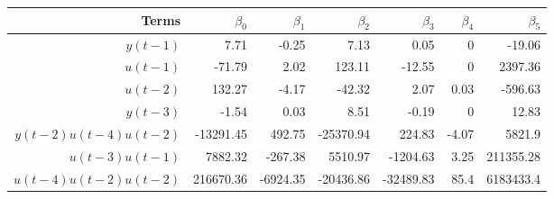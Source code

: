 \begin{tabular}{rrrrrrr}
Terms & $\beta_0$ & $\beta_1$ & $\beta_2$ & $\beta_3$ & $\beta_4$ & $\beta_5$ \\ 
\hline 
$y(t-1)$ & 7.71 & -0.25 & 7.13 & 0.05 & 0 & -19.06 \\ 
$u(t-1)$ & -71.79 & 2.02 & 123.11 & -12.55 & 0 & 2397.36 \\ 
$u(t-2)$ & 132.27 & -4.17 & -42.32 & 2.07 & 0.03 & -596.63 \\ 
$y(t-3)$ & -1.54 & 0.03 & 8.51 & -0.19 & 0 & 12.83 \\ 
$y(t-2)u(t-4)u(t-2)$ & -13291.45 & 492.75 & -25370.94 & 224.83 & -4.07 & 5821.9 \\ 
$u(t-3)u(t-1)$ & 7882.32 & -267.38 & 5510.97 & -1204.63 & 3.25 & 211355.28 \\ 
$u(t-4)u(t-2)u(t-2)$ & 216670.36 & -6924.35 & -20436.86 & -32489.83 & 85.4 & 6183433.4 \\ 
\hline 
\end{tabular}